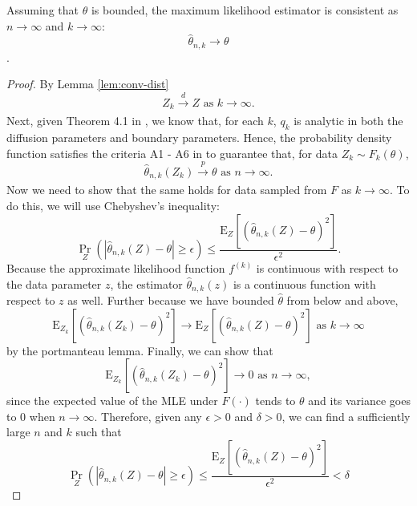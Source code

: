 \begin{lemma}
  Assuming that $\theta$ is bounded, the maximum likelihood estimator
  is consistent as $n \to \infty$ and
  $k \to \infty$: \[ \hat{\theta}_{n,k} \to \theta \].
\end{lemma}
\begin{proof}
  By Lemma \ref{lem:conv-dist}
    \[ Z_k \xrightarrow[]{d} Z \mbox { as } k \to \infty. \] Next,
    given Theorem 4.1 in \cite{singler2008differentiability}, we know
    that, for each $k$, $q_k$ is analytic in both the diffusion
    parameters and boundary parameters. Hence, the probability density
    function satisfies the criteria A1 - A6 in
    \cite{casella2002statistical} to guarantee that, for data
    $Z_{k} \sim F_k(\theta)$,
    \[ \hat{\theta}_{n,k}(Z_k) \xrightarrow[]{p} \theta \mbox{ as } n
      \to \infty. \]
    Now we need to show that the same holds for data sampled from $F$
    as $k \to \infty$. To do this, we will use Chebyshev's inequality:
      \[
    \Pr_{Z}\left( \left| \hat{\theta}_{n,k}(Z) - \theta \right| \geq
      \epsilon \right) \leq \frac{ \mbox{E}_{Z}\left[
        (\hat{\theta}_{n,k}(Z) - \theta)^2 \right] }{ \epsilon^2 }.
  \]
  Because the approximate likelihood function $f^{(k)}$ is continuous
  with respect to the data parameter $z$, the estimator
  $\hat{\theta}_{n,k}(z)$ is a continuous function with respect to $z$
  as well. Further because we have bounded $\hat{\theta}$ from below
  and above,
  \[
    \mbox{E}_{Z_k}\left[ (\hat{\theta}_{n,k}(Z_k) - \theta)^2 \right]
    \to \mbox{E}_{Z}\left[ (\hat{\theta}_{n,k}(Z) - \theta)^2 \right]
    \mbox{ as } k \to \infty
  \]
  by the portmanteau lemma. Finally, we can show that
  \begin{equation}
    \mbox{E}_{Z_k}\left[ (\hat{\theta}_{n,k}(Z_k) - \theta)^2 \right]
    \to 0 \mbox{ as } n \to \infty, \label{eq:var-lim}
  \end{equation}
  since the expected value of the MLE under $F(\cdot)$ tends to
  $\theta$ and its variance goes to 0 when $n \to \infty$. Therefore,
  given any $\epsilon > 0$ and $\delta > 0$, we can find a
  sufficiently large $n$ and $k$ such that
  \[
    \Pr_{Z}\left( \left| \hat{\theta}_{n,k}(Z) - \theta \right| \geq
      \epsilon \right) \leq \frac{ \mbox{E}_{Z}\left[
        (\hat{\theta}_{n,k}(Z) - \theta)^2 \right] }{ \epsilon^2 } < \delta
  \]
\end{proof}

